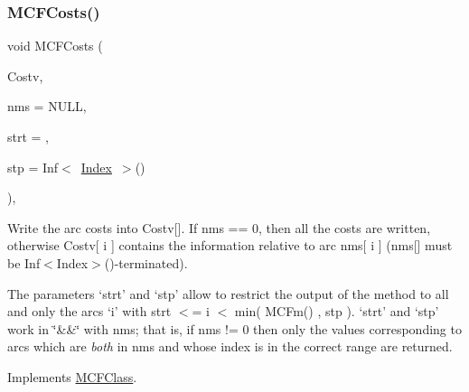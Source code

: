 \mbox{\label{class_m_c_f_cplex_a1a7da972e0e55e14fe9459fd5cd7d374}} 
\subsubsection{\texorpdfstring{M\+C\+F\+Costs()}{MCFCosts()}}
{\footnotesize\ttfamily void M\+C\+F\+Costs (\begin{DoxyParamCaption}\item[{\mbox{\hyperlink{class_m_c_f_class_a62409402be4e4b301e1a568f99f877be}{C\+Row}}}]{Costv,  }\item[{\mbox{\hyperlink{class_m_c_f_class_a81575b2d4e4d5636b17170432150ae69}{c\+Index\+\_\+\+Set}}}]{nms = {\ttfamily NULL},  }\item[{\mbox{\hyperlink{class_m_c_f_class_a76aaabb20535c51a2752b93f6c38fe54}{c\+Index}}}]{strt = {},  }\item[{\mbox{\hyperlink{class_m_c_f_class_ad53d6229d7ec28555a9c9c2fd9abf773}{Index}}}]{stp = {\ttfamily Inf$<$~\mbox{\hyperlink{class_m_c_f_class_ad53d6229d7ec28555a9c9c2fd9abf773}{Index}}~$>$()} }\end{DoxyParamCaption})\hspace{0.3cm}{\ttfamily [override]}, {\ttfamily [virtual]}}

Write the arc costs into Costv\mbox{[}\mbox{]}. If nms == 0, then all the costs are written, otherwise Costv\mbox{[} i \mbox{]} contains the information relative to arc nms\mbox{[} i \mbox{]} (nms\mbox{[}\mbox{]} must be Inf$<$\+Index$>$()-\/terminated).

The parameters `strt' and `stp' allow to restrict the output of the method to all and only the arcs `i' with strt $<$= i $<$ min( M\+C\+Fm() , stp ). `strt' and `stp' work in \char`\"{}\&\&\char`\"{} with nms; that is, if nms != 0 then only the values corresponding to arcs which are {\itshape both} in nms and whose index is in the correct range are returned. 

Implements \mbox{\hyperlink{class_m_c_f_class_ab6dbac4cde9477589de653081986abb4}{M\+C\+F\+Class}}.

\mbox{\label{class_m_c_f_cplex_ac6107cdac23180a7723ea0365d8f07a4}} 

